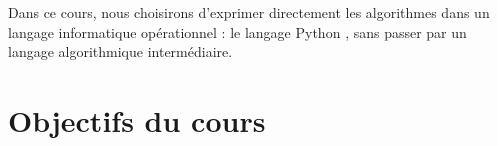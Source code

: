 Dans ce cours, nous choisirons d'exprimer directement les algorithmes dans un 
langage informatique opérationnel : le langage {\sc Python} \cite{swinnen}, sans passer par un
langage algorithmique intermédiaire.

\section{Objectifs du cours}
%
%


